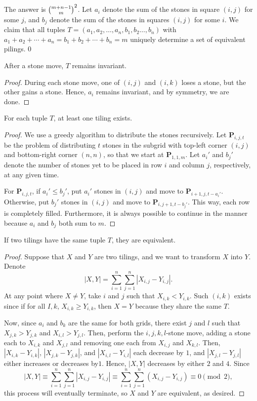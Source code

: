 The answer is $\tbinom{m+n-1}m^2$. Let $a_i$ denote the sum of the stones in square $(i,j)$ for some $j$, and $b_j$ denote the sum of the stones in squares $(i,j)$ for some $i$. We claim that all tuples $T=(a_1,a_2,\ldots,a_n,b_1,b_2\ldots,b_n)$ with $a_1+a_2+\cdots+a_n=b_1+b_2+\cdots+b_n=m$
uniquely determine a set of equivalent pilings.
\setcounter{boxlemma}0
\begin{boxlemma}
    After a stone move, $T$ remains invariant.
\end{boxlemma}
\begin{proof}
    During each stone move, one of $(i,j)$ and $(i,k)$ loses a stone, but the other gains a stone. Hence, $a_i$ remains invariant, and by symmetry, we are done.
\end{proof}
\begin{boxlemma}
    For each tuple $T$, at least one tiling exists.
\end{boxlemma}
\begin{proof}
    We use a greedy algorithm to distribute the stones recursively. Let $\mathbf P_{i,j,t}$ be the problem of distributing $t$ stones in the subgrid with top-left corner $(i,j)$ and bottom-right corner $(n,n)$, so that we start at $\mathbf P_{1,1,m}$. Let $a_i'$ and $b_j'$ denote the number of stones yet to be placed in row $i$ and column $j$, respectively, at any given time.

    For $\mathbf P_{i,j,t}$, if $a_i'\le b_j'$, put $a_i'$ stones in $(i,j)$ and move to $\mathbf P_{i+1,j,t-a_i'}$. Otherwise, put $b_j'$ stones in $(i,j)$ and move to $\mathbf P_{i,j+1,t-b_j'}$. This way, each row is completely filled. Furthermore, it is always possible to continue in the manner because $a_i$ and $b_j$ both sum to $m$.
\end{proof}
\begin{boxlemma}
    If two tilings have the same tuple $T$, they are equivalent.
\end{boxlemma}
\begin{proof}
    Suppose that $X$ and $Y$ are two tilings, and we want to transform $X$ into $Y$. Denote \[|X,Y|=\sum_{i=1}^n\sum_{j=1}^n\left|X_{i,j}-Y_{i,j}\right|.\]
    At any point where $X\ne Y$, take $i$ and $j$ such that $X_{i,k}<Y_{i,k}$. Such $(i,k)$ exists since if for all $I,k$, $X_{i,k}\ge Y_{i,k}$, then $X=Y$ because they share the same $T$.

    Now, since $a_i$ and $b_k$ are the same for both grids, there exist $j$ and $l$ such that $X_{j,k}>Y_{j,k}$ and $X_{i,l}>Y_{j,l}$. Then, perform the $i,j,k,l$-stone move, adding a stone each to $X_{i,k}$ and $X_{j,l}$ and removing one each from $X_{i,j}$ and $X_{k,l}$. Then, $|X_{i,k}-Y_{i,k}|$, $|X_{j,k}-Y_{j,k}|$, and $|X_{i,l}-Y_{i,l}|$ each decrease by $1$, and $|X_{j,l}-Y_{j,l}|$ either increases or decreases by$1$. Hence, $|X,Y|$ decreases by either $2$ and $4$. Since \[|X,Y|\equiv\sum_{i=1}^n\sum_{j=1}^n\left|X_{i,j}-Y_{i,j}\right|\equiv\sum_{i=1}^n\sum_{j=1}^n\left(X_{i,j}-Y_{i,j}\right)\equiv 0\pmod2,\]
    this process will eventually terminate, so $X$ and $Y$ are equivalent, as desired.
\end{proof}

